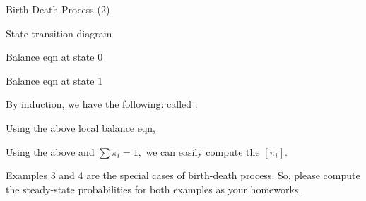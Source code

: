 \begin{frame}{Birth-Death Process (2)}


{
\small
  \plitemsep 0.03in
  \bci
  
\item State transition diagram
\vspace{-0.4cm}

\item<2-> Balance eqn at state 0

\item<4-> Balance eqn at state 1  
\eci
}
{
\small
  \plitemsep 0.02in
  \bci
\item<7-> By induction, we have the following: called :

\item<9-> Using the above local balance eqn,
\vspace{-0.2cm}
\vspace{-0.4cm}

\item<10-> Using the above and $\sum \pi_i =1,$ we can easily compute the $[\pi_i].$


\item<11-> Examples 3 and 4 are the special cases of birth-death
  process. So, please compute the steady-state probabilities for both
  examples as your homeworks.  

  \eci
 
}
  


\end{frame}



